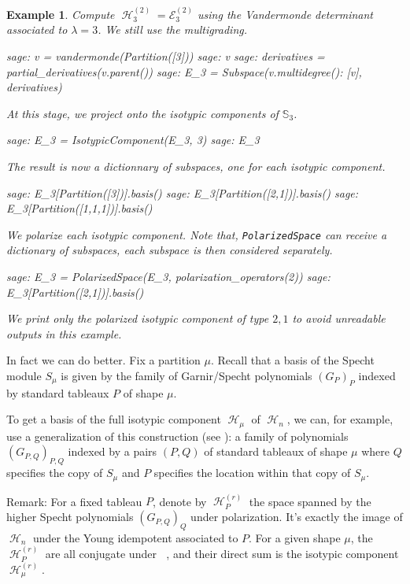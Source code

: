 \documentclass[letter,12pt]{article}
\newcommand{\pauline}[1]{\todo[linecolor=blue,backgroundcolor=blue!25,bordercolor=blue]{#1}}
\newcommand{\Sym}[1]{\mathbb{S}_{#1}}
\DeclareMathOperator{\Sn}{\mathbb{S}_n}
\DeclareMathOperator{\harmonics}{\mathcal{H}}
\newtheorem{example}{Example}
\begin{document}
	\begin{example} \label{multigrading}
		Compute $\harmonics_3^{(2)} = \mathcal{E}_3^{(2)}$ using the Vandermonde determinant associated to $\lambda=3$. We still use the multigrading. 
		\begin{sagecommandline}
			sage: v = vandermonde(Partition([3]))
			sage: v
			sage: derivatives = partial_derivatives(v.parent())
			sage: E_3 = Subspace({v.multidegree(): [v]}, derivatives)
		\end{sagecommandline}
		At this stage, we project onto the isotypic components of $\Sym{3}$.
		\begin{sagecommandline}
			sage: E_3 = IsotypicComponent(E_3, 3)
			sage: E_3
		\end{sagecommandline}
		The result is now a dictionnary of subspaces, one for each isotypic component.
		\begin{sagecommandline}
			sage: E_3[Partition([3])].basis()
			sage: E_3[Partition([2,1])].basis()
			sage: E_3[Partition([1,1,1])].basis()
		\end{sagecommandline}
		We polarize each isotypic component. Note that, \texttt{PolarizedSpace} can receive a dictionary of subspaces, each subspace is then considered separately. 
		\begin{sagecommandline}
			sage: E_3 = PolarizedSpace(E_3, polarization_operators(2))
			sage: E_3[Partition([2,1])].basis()
		\end{sagecommandline}
	We print only the polarized isotypic component of type $2,1$ to avoid unreadable outputs in this example. 	
	\end{example}
		
	In fact we can do better. \pauline{Does it work only for $\harmonics_n^{(r)}$ or also for $\mathcal{E}_\lambda$?}
	Fix a partition $\mu$. Recall that a basis of the Specht module $S_\mu$  is given by the family of Garnir/Specht polynomials $(G_{P})_P$ indexed by standard tableaux $P$ of shape $\mu$.
	
	To get a basis of the full isotypic component $\harmonics_{\mu}$ of $\harmonics_n$, we can, for example, use a generalization of this construction (see \cite{Ariki1997}): a family of polynomials $(G_{P,Q})_{P,Q}$ indexed by a pairs $(P,Q)$ of standard tableaux of shape $\mu$ where $Q$ specifies the copy of $S_\mu$ and $P$ specifies the location within that copy of $S_\mu$.
	
	
	Remark: For a fixed tableau $P$, denote by $\harmonics_P^{(r)}$ the space spanned by the higher Specht polynomials $(G_{P,Q})_Q$ under polarization. It's exactly the image of $\harmonics_n$ under the Young idempotent associated to $P$. For a given shape $\mu$, the $\harmonics_P^{(r)}$ are all conjugate under $\Sn$, and their direct sum is the isotypic component $\harmonics_{\mu}^{(r)}$.
	
\end{document}

